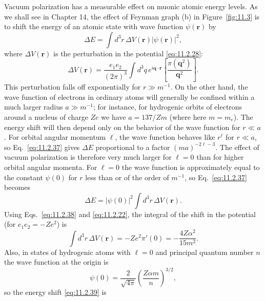 Vacuum polarization has a measurable effect on muonic atomic energy
levels. As we shall see in Chapter 14, the effect of Feynman graph (b) in
Figure~\ref{fig:11.3} is to shift the energy of an atomic state with wave function
$\psi(\mathbf r)$ by
\begin{equation}
  \Delta E=\int d^3r\,\Delta V(\mathbf r)|\psi(\mathbf r)|^2,
  \tag{11.2.37}\label{eq:11.2.37}
\end{equation}
where $\Delta V(\mathbf r)$ is the perturbation in the potential \eqref{eq:11.2.28}:
\begin{equation}
  \Delta V(\mathbf r)=\frac{e_1e_2}{(2\pi)^3}\int d^3q\,
  e^{i\mathbf q\cdot\mathbf r}\left[\frac{\pi(\mathbf q^2)}{\mathbf q^2}\right].
  \tag{11.2.38}\label{eq:11.2.38}
\end{equation}
This perturbation falls off exponentially for $r\gg m^{-1}$. On the other
hand, the wave function of electrons in ordinary atoms will generally be
confined within a much larger radius $a\gg m^{-1}$; for instance, for
hydrogenic orbits of electrons around a nucleus of charge $Ze$ we have
$a=137/Zm$ (where here $m=m_e$). The energy shift will then depend only
on the behavior of the wave function for $r\ll a$. For orbital angular
momentum $\ell$, the wave function behaves like $r^\ell$ for $r\ll a$, so
Eq.~\eqref{eq:11.2.37} gives $\Delta E$ proportional to a factor $(ma)^{-2\ell-3}$.
The effect of vacuum polarization is therefore very much larger for $\ell=0$
than for higher orbital angular momenta. For $\ell=0$ the wave function is
approximately equal to the constant $\psi(0)$ for $r$ less than or of the
order of $m^{-1}$, so Eq.~\eqref{eq:11.2.37} becomes
\begin{equation}
  \Delta E=|\psi(0)|^2\int d^3r\,\Delta V(\mathbf r).
  \tag{11.2.39}\label{eq:11.2.39}
\end{equation}
Using Eqs.~\eqref{eq:11.2.38} and \eqref{eq:11.2.22}, the integral of the shift in the potential
(for $e_1e_2=-Ze^2$) is
\begin{equation}
  \int d^3r\,\Delta V(\mathbf r)=-Ze^2\pi'(0)
  =-\frac{4Z\alpha^2}{15m^2}.
  \tag{11.2.40}\label{eq:11.2.40}
\end{equation}
Also, in states of hydrogenic atoms with $\ell=0$ and principal quantum
number $n$ the wave function at the origin is
\begin{equation}
  \psi(0)=\frac2{\sqrt{4\pi}}\left(\frac{Z\alpha m}{n}\right)^{3/2},
  \tag{11.2.41}\label{eq:11.2.41}
\end{equation}
so the energy shift \eqref{eq:11.2.39} is
